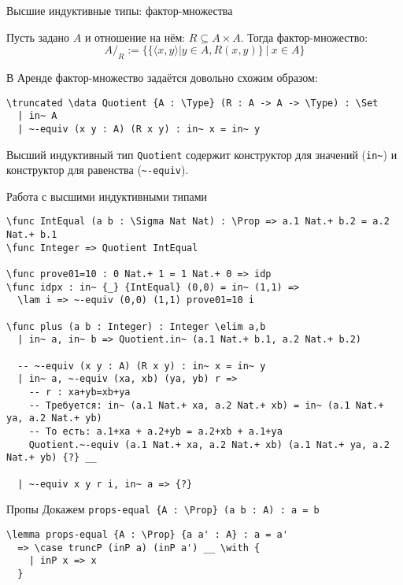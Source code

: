 \documentclass[aspectratio=169,dvipsnames,usenames]{beamer}
\begin{document}
\begin{frame}[fragile]{Высшие индуктивные типы: фактор-множества}
\begin{dfn}Пусть задано $A$ и отношение на нём: $R \subseteq A \times A$. Тогда фактор-множество:
$$A/_R := \big\{ \{\langle x,y\rangle |y \in A, R(x,y)\}\ |\ x \in A\big\}$$\end{dfn}

В Аренде фактор-множество задаётся довольно схожим образом:

\begin{verbatim}
\truncated \data Quotient {A : \Type} (R : A -> A -> \Type) : \Set
  | in~ A
  | ~-equiv (x y : A) (R x y) : in~ x = in~ y
\end{verbatim}

Высший индуктивный тип \verb!Quotient! содержит конструктор для значений (\verb!in~!)
и конструктор для равенства (\verb!~-equiv!).
\end{frame}

\begin{frame}[fragile]{Работа с высшими индуктивными типами}
\footnotesize\begin{verbatim}
\func IntEqual (a b : \Sigma Nat Nat) : \Prop => a.1 Nat.+ b.2 = a.2 Nat.+ b.1
\func Integer => Quotient IntEqual

\func prove01=10 : 0 Nat.+ 1 = 1 Nat.+ 0 => idp
\func idpx : in~ {_} {IntEqual} (0,0) = in~ (1,1) =>
  \lam i => ~-equiv (0,0) (1,1) prove01=10 i

\func plus (a b : Integer) : Integer \elim a,b
  | in~ a, in~ b => Quotient.in~ (a.1 Nat.+ b.1, a.2 Nat.+ b.2)

  -- ~-equiv (x y : A) (R x y) : in~ x = in~ y
  | in~ a, ~-equiv (xa, xb) (ya, yb) r =>
    -- r : xa+yb=xb+ya
    -- Требуется: in~ (a.1 Nat.+ xa, a.2 Nat.+ xb) = in~ (a.1 Nat.+ ya, a.2 Nat.+ yb)
    -- То есть: a.1+xa + a.2+yb = a.2+xb + a.1+ya
    Quotient.~-equiv (a.1 Nat.+ xa, a.2 Nat.+ xb) (a.1 Nat.+ ya, a.2 Nat.+ yb) {?} __

  | ~-equiv x y r i, in~ a => {?}
\end{verbatim}
\end{frame}

\begin{frame}[fragile]{Пропы}
Докажем \verb!props-equal {A : \Prop} (a b : A) : a = b!

\begin{verbatim}
\lemma props-equal {A : \Prop} {a a' : A} : a = a'
  => \case truncP (inP a) (inP a') __ \with {
    | inP x => x
  }
\end{verbatim}

\end{frame}
\end{document}
